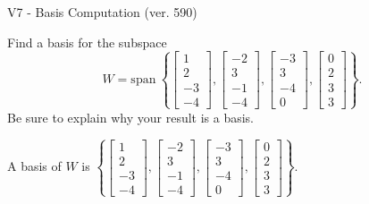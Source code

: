 \begin{exercise}
  \begin{exerciseTitle}V7 - Basis Computation (ver. 590)\end{exerciseTitle}
  \begin{exerciseStatement}
    Find a basis for the subspace 
\[W=\mathrm{span}\ \left\{\left[\begin{array}{r}
1 \\
2 \\
-3 \\
-4
\end{array}\right] , \left[\begin{array}{r}
-2 \\
3 \\
-1 \\
-4
\end{array}\right] , \left[\begin{array}{r}
-3 \\
3 \\
-4 \\
0
\end{array}\right] , \left[\begin{array}{r}
0 \\
2 \\
3 \\
3
\end{array}\right]\right\}.\]
 Be sure to explain why your result is a basis.


  \end{exerciseStatement}
  \begin{exerciseAnswer}
   A basis of \(W\) is  \(\left\{\left[\begin{array}{r}
1 \\
2 \\
-3 \\
-4
\end{array}\right] , \left[\begin{array}{r}
-2 \\
3 \\
-1 \\
-4
\end{array}\right] , \left[\begin{array}{r}
-3 \\
3 \\
-4 \\
0
\end{array}\right] , \left[\begin{array}{r}
0 \\
2 \\
3 \\
3
\end{array}\right]\right\}\).
  


  \end{exerciseAnswer}
\end{exercise}